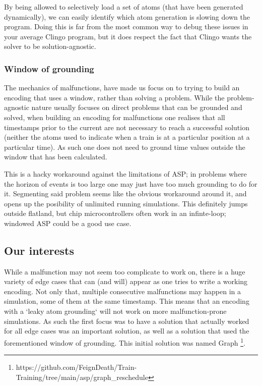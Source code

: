 By being allowed to selectively load a set of atoms (that have been generated dynamically), we can easily identify which atom generation is slowing down the program. Doing this is far from the most common way to debug these issues in your average Clingo program, but it does respect the fact that Clingo wants the solver to be solution-agnostic. 


\subsubsection{Window of grounding}
\label{sec:window}
The mechanics of malfunctions, have made us focus on to trying to build an encoding that uses a window, rather than solving a problem. While the problem-agnostic nature usually focuses on direct problems that can be grounded and solved, when building an encoding for malfunctions one realises that all timestamps prior to the current are not necessary to reach a successful solution (neither the atoms used to indicate when a train is at a particular position at a particular time). As such one does not need to ground time values outside the window that has been calculated.

This is a hacky workaround against the limitations of ASP; in problems where the horizon of events is too large one may just have too much grounding to do for it. Segmenting said problem seems like the obvious workaround around it, and opens up the posibility of unlimited running simulations. This definitely jumps outside flatland, but chip microcontrollers often work in an infinte-loop; windowed ASP could be a good use case.
  

\subsection{Our interests}
While a malfunction may not seem too complicate to work on, there is a huge variety of edge cases that can (and will) appear as one tries to write a working encoding. Not only that, multiple consecutive malfunctions may happen in a simulation, some of them at the same timestamp. This means that an encoding with a `leaky atom grounding` will not work on more malfunction-prone simulations. As such the first focus was to have a solution that actually worked for all edge cases was an important solution, as well as a solution that used the forementioned window of grounding. This initial solution was named Graph \footnote{https://github.com/FeignDeath/Train-Training/tree/main/asp/graph\_reschedule}. 


